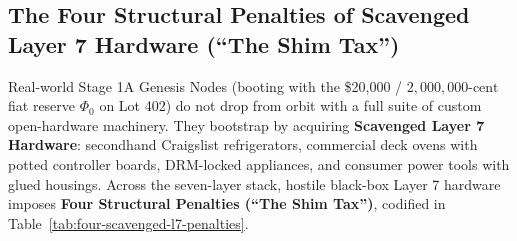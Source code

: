 \subsection{The Four Structural Penalties of Scavenged Layer 7 Hardware (``The Shim Tax'')}
\label{subsec:four-penalties-scavenged-l7}

Real-world Stage 1A Genesis Nodes (booting with the \$20,000 / $2{,}000{,}000\text{-cent}$ fiat reserve $\Phi_0$ on Lot 402) do not drop from orbit with a full suite of custom open-hardware machinery. They bootstrap by acquiring \textbf{Scavenged Layer 7 Hardware}: secondhand Craigslist refrigerators, commercial deck ovens with potted controller boards, DRM-locked appliances, and consumer power tools with glued housings. Across the seven-layer stack, hostile black-box Layer 7 hardware imposes \textbf{Four Structural Penalties (``The Shim Tax'')}, codified in Table~\ref{tab:four-scavenged-l7-penalties}.


